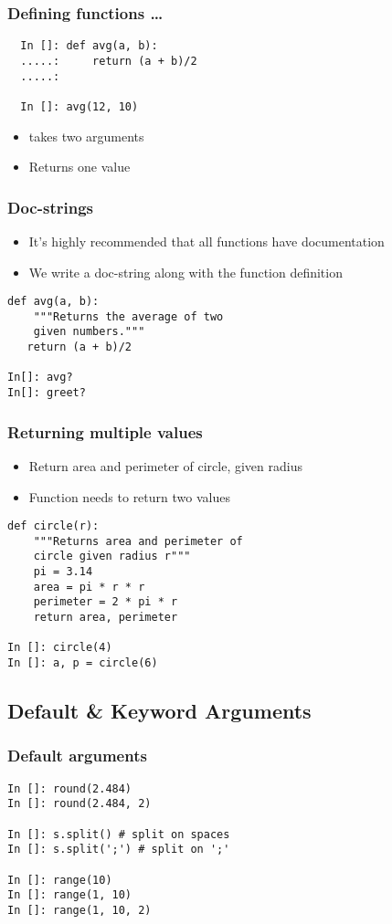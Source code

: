 \documentclass[14pt,compress]{beamer}
\begin{document}
\begin{frame}[fragile]
  \frametitle{Defining functions \ldots}
  \begin{lstlisting}
  In []: def avg(a, b):
  .....:     return (a + b)/2
  .....:

  In []: avg(12, 10)
\end{lstlisting}
\begin{itemize}
\item {} takes two arguments
\item Returns one value
\end{itemize}
\end{frame}

\begin{frame}[fragile]
  \frametitle{Doc-strings}
  \begin{itemize}
  \item It's highly recommended that all functions have documentation
  \item We write a doc-string along with the function definition
  \end{itemize}
  \begin{lstlisting}
def avg(a, b):
    """Returns the average of two
    given numbers."""
   return (a + b)/2

In[]: avg?
In[]: greet?
  \end{lstlisting}
\end{frame}

\begin{frame}[fragile]
  \frametitle{Returning multiple values}
  \begin{itemize}
  \item Return area and perimeter of circle, given radius
  \item Function needs to return two values
  \end{itemize}
  \begin{lstlisting}
def circle(r):
    """Returns area and perimeter of
    circle given radius r"""
    pi = 3.14
    area = pi * r * r
    perimeter = 2 * pi * r
    return area, perimeter

In []: circle(4)
In []: a, p = circle(6)
  \end{lstlisting}
\end{frame}


\subsection{Default \& Keyword Arguments}

\begin{frame}[fragile]
  \frametitle{Default arguments}
  \begin{lstlisting}
In []: round(2.484)
In []: round(2.484, 2)

In []: s.split() # split on spaces
In []: s.split(';') # split on ';'

In []: range(10)
In []: range(1, 10)
In []: range(1, 10, 2)
  \end{lstlisting}
\end{frame}
\end{document}
